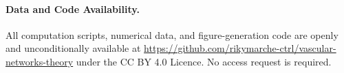 \documentclass[11pt,a4paper]{article}
\theoremstyle{remark}
\begin{document}
\paragraph*{Data and Code Availability.}
All computation scripts, numerical data, and figure-generation code are openly
and unconditionally available at
\url{https://github.com/rikymarche-ctrl/vascular-networks-theory} under the CC BY 4.0
Licence. No access request is required.



\end{document}
